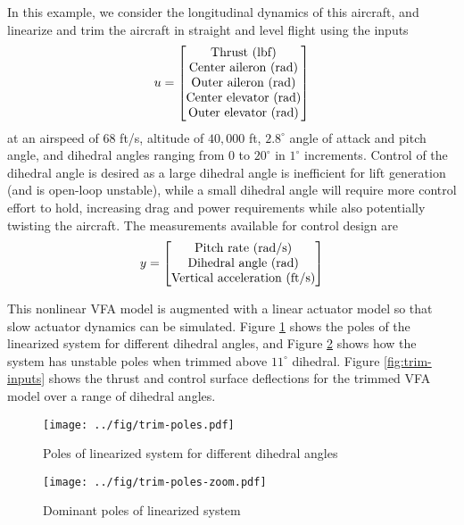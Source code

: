 \documentclass[english]{IEEEtran}
\begin{document}
In this example, we consider the longitudinal dynamics of this aircraft, and linearize and trim the aircraft in straight and level flight using the inputs
\begin{equation}
	u = \begin{bmatrix}
		$Thrust (lbf)$\\
		$Center aileron (rad)$\\
		$Outer aileron (rad)$\\
		$Center elevator (rad)$\\
		$Outer elevator (rad)$
	\end{bmatrix}
\end{equation}
at an airspeed of $68$ ft/s, altitude of $40,000$ ft, $2.8^\circ$ angle of attack and pitch angle, and dihedral angles ranging from $0$ to $20^\circ$ in $1^\circ$ increments. Control of the dihedral angle is desired as a large dihedral angle is inefficient for lift generation (and is open-loop unstable), while a small dihedral angle will require more control effort to hold, increasing drag and power requirements while also potentially twisting the aircraft. The measurements available for control design are
\begin{equation}
y = \begin{bmatrix}
	$Pitch rate (rad/s)$\\
	$Dihedral angle (rad)$\\
	$Vertical acceleration (ft/s)$
\end{bmatrix}	
\end{equation}

This nonlinear VFA model is augmented with a linear actuator model so that slow actuator dynamics can be simulated. Figure \ref{fig:trim-poles} shows the poles of the linearized system for different dihedral angles, and Figure \ref{fig:trim-poles-zoom} shows how the system has unstable poles when trimmed above $11^\circ$ dihedral. Figure \ref{fig:trim-inputs} shows the thrust and control surface deflections for the trimmed VFA model over a range of dihedral angles.

\begin{figure}[htbp]
	\centering
	\texttt{[image: ../fig/trim-poles.pdf]}
	\caption{Poles of linearized system for different dihedral angles}
	\label{fig:trim-poles}
\end{figure}

\begin{figure}[htbp]
	\centering
	\texttt{[image: ../fig/trim-poles-zoom.pdf]}
	\caption{Dominant poles of linearized system}
	\label{fig:trim-poles-zoom}
\end{figure}
\end{document}
